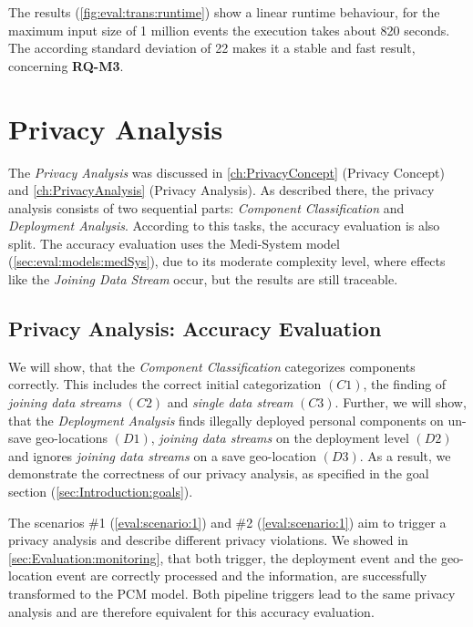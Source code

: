 The results (\autoref{fig:eval:trans:runtime}) show a linear runtime behaviour, for the maximum input size of 1 million events the execution takes about 820 seconds. The according standard deviation of 22 makes it a stable and fast result, concerning \textbf{RQ-M3}.

\section{Privacy Analysis}
\label{sec:Evaluation:privacyanalysis}

The \textit{Privacy Analysis} was discussed in \autoref{ch:PrivacyConcept} (Privacy Concept) and \autoref{ch:PrivacyAnalysis} (Privacy Analysis). As described there, the privacy analysis consists of two sequential parts: \textit{Component Classification} and \textit{Deployment Analysis}. According to this tasks, the accuracy evaluation is also split. The accuracy evaluation uses the Medi-System model (\autoref{sec:eval:models:medSys}), due to its moderate complexity level, where effects like the \textit{Joining Data Stream} occur, but the results are still traceable.

\subsection{Privacy Analysis: Accuracy Evaluation}

We will show, that the \textit{Component Classification} categorizes components correctly. This includes the correct initial categorization $(C1)$, the finding of \textit{joining data streams} $(C2)$ and \textit{single data stream} $(C3)$. Further, we will show, that the \textit{Deployment Analysis} finds illegally deployed personal components on un-save geo-locations $(D1)$, \textit{joining data streams} on the deployment level $(D2)$ and ignores \textit{joining data streams} on a save geo-location $(D3)$. As a result, we demonstrate the correctness of our privacy analysis, as specified in the goal section (\autoref{sec:Introduction:goals}).

The scenarios \#1 (\autoref{eval:scenario:1}) and \#2 (\autoref{eval:scenario:1}) aim to trigger a privacy analysis and describe different privacy violations. We showed in \autoref{sec:Evaluation:monitoring}, that both trigger, the deployment event and the geo-location event are correctly processed and the information, are successfully transformed to the PCM model. Both pipeline triggers lead to the same privacy analysis and are therefore equivalent for this accuracy evaluation. 

